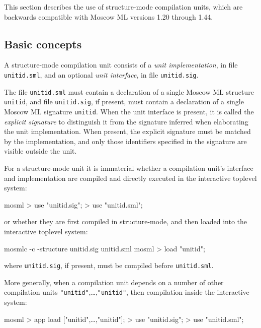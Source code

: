 \documentclass[fleqn,a4paper]{article}
\begin{document}
This section describes the use of structure-mode compilation units,
which are backwards compatible with Moscow ML versions 1.20 through
1.44.


\subsection{Basic concepts}

A structure-mode compilation unit consists of a {\em unit
  implementation}, in file \texttt{unitid.sml}, and an optional {\em
  unit interface}, in file \texttt{unitid.sig}\@.  

The file \texttt{unitid.sml} must contain a declaration of a single
Moscow ML structure \texttt{unitid}, and file \texttt{unitid.sig}, if
present, must contain a declaration of a single Moscow ML signature
\texttt{unitid}.  When the unit interface is present, it is called the
{\em explicit signature\/} to distinguish it from the signature
inferred when elaborating the unit implementation.  When present, the
explicit signature must be matched by the implementation, and only
those identifiers specified in the signature are visible outside the
unit.

For a structure-mode unit it is immaterial whether a compilation
unit's interface and implementation are compiled and directly executed
in the interactive toplevel system:

\begin{program}
mosml
> use "unitid.sig";
> use "unitid.sml";
\end{program}

\noindent 
or whether they are first compiled in structure-mode, and then loaded
into the interactive toplevel system:

\begin{program}
mosmlc -c -structure unitid.sig unitid.sml 
mosml
> load "unitid";
\end{program}

\noindent where \texttt{unitid.sig}, if present, must be compiled
before \texttt{unitid.sml}.

More generally, when a compilation unit depends on a number of other
compilation units \texttt{"unitid\et"},\ldots,\texttt{"unitid\n"},
then compilation inside the interactive system:

\begin{program}
mosml
> app load ["unitid\et",\ldots,"unitid\n"];
> use "unitid.sig";
> use "unitid.sml";
\end{program}
\end{document}
